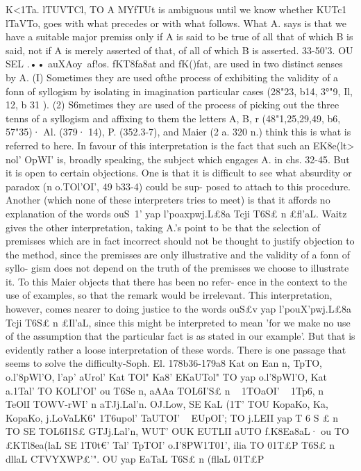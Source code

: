 {{{{{{{{{{{{{{{{{{{{{{{{{{{{K<1Ta. lTUVTCl, TO A MYfTUt is ambiguous until we know whether KUTc1
lTaVTo, goes with what precedes or with what follows. What A.
says is that we have a suitable major premiss only if A is said
to be true of all that of which B is said, not if A is merely asserted
of that, of all of which B is asserted.
33-50'3. OU SEL .•• auXAoy~af!os. fKT{8fa8at and fK()fat, are
used in two distinct senses by A. (I) Sometimes they are used ofthe process of exhibiting the validity of a fonn of syllogism by
isolating in imagination particular cases (28"23, b14, 3°"9, Il, 12,
b 31 ). (2) S6metimes they are used of the process of picking out
the three tenns of a syllogism and affixing to them the letters
A, B, r (48"1,25,29,49, b6, 57"35)· Al. (379· 14), P. (352.3-7), and
Maier (2 a. 320 n.) think this is what is referred to here. In favour
of this interpretation is the fact that such an EK8e(lt> nol' OpWI' is,
broadly speaking, the subject which engages A. in chs. 32-45.
But it is open to certain objections. One is that it is difficult to
see what absurdity or paradox (n o.TOl'OI', 49 b33-4) could be sup-
posed to attach to this procedure. Another (which none of these
interpreters tries to meet) is that it affords no explanation of the
words ouS~1' yap l'poaxpwj.L£8a Tcji T6S£ n £fl'aL.
Waitz gives the other interpretation, taking A.'s point to be
that the selection of premisses which are in fact incorrect should
not be thought to justify objection to the method, since the
premisses are only illustrative and the validity of a fonn of syllo-
gism does not depend on the truth of the premisses we choose to
illustrate it. To this Maier objects that there has been no refer-
ence in the context to the use of examples, so that the remark
would be irrelevant. This interpretation, however, comes nearer
to doing justice to the words ouS£v yap l'pouX'pwj.L£8a Tcji T6S£ n
£Il'aL, since this might be interpreted to mean 'for we make no
use of the assumption that the particular fact is as stated in our
example'. But that is evidently rather a loose interpretation of
these words.
There is one passage that seems to solve the difficulty-Soph.
El. 178b36-179a8 Kat on Ean n, Tp{TO, o.l'8pWl'O, l'ap' aUrol' Kat TOl"
Ka8' EKaUTol" TO yap o.l'8pWl'O, Kat a.1Tal' TO KOLI'OI' ou T6Se n, aAAa
TOL6I'S£ n ~ 1TOaOI' ~ 1Tp6, n ~ TeOlI TOWV-rWI' n aTJj.La{l'n. OJ.Lo{w, SE KaL
(1T' TOU Kop{aKo, Ka, Kop{aKo, j.LoVaLK6" 1T6upol' TaUTOI' ~ EUpOI'; TO
j.LEII yap T 6 S £ n TO SE TOL6I1S£ GTJj.La{l'n, WUT' OUK EUTLII aUTO
f.K8Ea8aL· ou TO £KTl8ea(laL SE 1T0t€' Tal' Tp{TOI' o.I'8PW1T01', ilia
TO 01T£P T6S£ n dllaL CTVYXWP£'". OU yap EaTaL T6S£ n (fllaL 01T£P
}}}}}}}}}}}}}}}}}}}}}}}}}}}}}}}}}}}}
